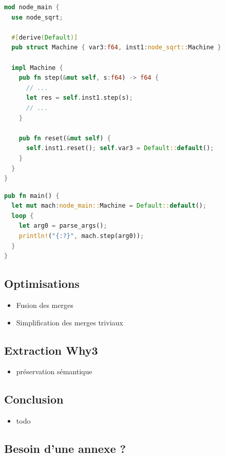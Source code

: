 \documentclass[11pt,usenames,dvipsnames]{beamer}
\begin{document}
\begin{frame}[fragile]{\null}
  \begin{lstlisting}[language=Rust]
mod node_main {
  use node_sqrt;

  #[derive(Default)]
  pub struct Machine { var3:f64, inst1:node_sqrt::Machine }

  impl Machine {
    pub fn step(&mut self, s:f64) -> f64 {
      // ...
      let res = self.inst1.step(s);
      // ...
    }

    pub fn reset(&mut self) {
      self.inst1.reset(); self.var3 = Default::default();
    }
  }
}
\end{lstlisting}
\end{frame}

\begin{frame}[fragile]{\null}
  \begin{lstlisting}[language=Rust]
pub fn main() {
  let mut mach:node_main::Machine = Default::default();
  loop {
    let arg0 = parse_args();
    println!("{:?}", mach.step(arg0));
  }
}
  \end{lstlisting}
\end{frame}



\subsection{Optimisations}
\begin{frame}{\null}
  \begin{itemize}
  \item Fusion des merges
  \item Simplification des merges triviaux
  \end{itemize}
\end{frame}

\subsection{Extraction Why3}
\begin{frame}{\null}
  \begin{itemize}
    \item préservation sémantique
  \end{itemize}
\end{frame}



\subsection{Conclusion}
\begin{frame}{\null}
  \begin{itemize}
  \item todo
  \end{itemize}
\end{frame}

\appendix
\subsection{Besoin d'une annexe ?}
\begin{frame}{\null}
\end{frame}
\end{document}
